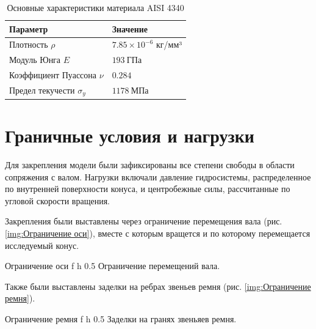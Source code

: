 \begin{table}[h]
    \centering
    \caption{Основные характеристики материала AISI 4340}
    \begin{tabularx}{\textwidth}{|l|X|}
        \hline
        \textbf{Параметр} & \textbf{Значение} \\
        \hline
        Плотность $\rho$ & $7{.}85 \times 10^{-6}$ кг/мм³ \\
        \hline
        Модуль Юнга $E$ & $193\ \text{ГПа}$ \\
        \hline
        Коэффициент Пуассона $\nu$ & $0.284$ \\
        \hline
        Предел текучести $\sigma_y$ & $1178\ \text{МПа}$ \\
        \hline
    \end{tabularx}
\end{table}

\newpage

\section*{Граничные условия и нагрузки}

Для закрепления модели были зафиксированы все степени свободы в области сопряжения с валом. Нагрузки включали давление гидросистемы, распределенное по внутренней поверхности конуса, и центробежные силы, рассчитанные по угловой скорости вращения.

Закрепления были выставлены через ограничение перемещения вала (рис. \ref{img:Ограничение оси}), вместе с которым вращется и по которому перемещается исследуемый конус.

    {Ограничение оси} %
    {f} %
    {h} %
    {0.5\textwidth} %
    {Ограничение перемещений вала.} %

\newpage

Также были выставлены заделки на ребрах звеньев ремня (рис. \ref{img:Ограничение ремня}).

    {Ограничение ремня} %
    {f} %
    {h} %
    {0.5\textwidth} %
    {Заделки на гранях звеньяев ремня.} %

\newpage

